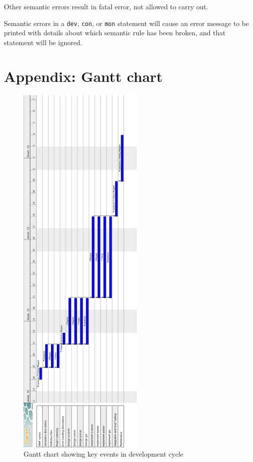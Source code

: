 \documentclass[a4paper,10pt]{article}
\begin{document}
Other semantic errors result in fatal error, not allowed to carry out.

Semantic errors in a \texttt{dev}, \texttt{con}, or \texttt{mon} statement will cause an error message to be printed with details about which semantic rule has been broken, and that statement will be ignored. 

\clearpage
\appendix

\section{Appendix: Gantt chart}
\label{appendix:gantt}
\begin{figure}[h]
 \centering
  \includegraphics[height=19cm]{Gantt-Chart.png}
 \caption{Gantt chart showing key events in development cycle}
 \label{fig:ganttchart}
\end{figure}
\end{document}

